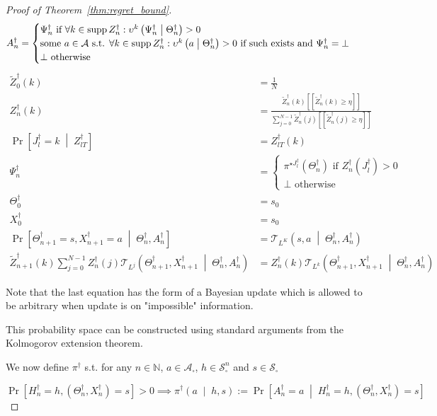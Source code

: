 \documentclass[anon,12pt]{colt2018} %
\DeclareMathOperator{\Supp}{supp}
\newcommand{\AP}[1]{\left(#1\right)}
\newcommand{\APM}[2]{\left(#1\;\middle\vert\;#2\right)}
\newcommand{\ABM}[2]{\left[#1\;\middle\vert\;#2\right]}
\newcommand{\CP}[3]{\underset{#1}{\operatorname{Pr}}\ABM{#2}{#3}}
\newcommand{\Nats}{\mathbb{N}}
\newcommand{\A}{\mathcal{A}}
\newcommand{\St}{\mathcal{S}}
\newcommand{\T}{\mathcal{T}}
\newcommand{\Ad}{\upsilon}
\begin{document}
\begin{proof}[Proof of Theorem~\ref{thm:regret_bound}]
\[A^\dagger_n = \begin{cases} \Psi^\dagger_n \text{ if } \forall k \in \Supp{Z^\dagger_n}: \Ad^k\APM{\Psi^\dagger_n}{\Theta^\dagger_n} > 0 \\ \text{some } a\in\A \text{ s.t. } \forall k \in \Supp{Z^\dagger_n}: \Ad^k\APM{a}{\Theta^\dagger_n} > 0 \text{ if such exists and } \Psi^\dagger_n=\bot\\\bot \text{ otherwise} \end{cases}\\\]
%
\begin{align*}
\tilde{Z}^\dagger_0(k)&=\frac{1}{N} \\ 
Z^\dagger_{n}(k) &= \frac{\tilde{Z}^\dagger_{n}(k)[[\tilde{Z}^\dagger_{n}(k) \geq \eta]] }{\sum_{j = 0}^{N-1}\tilde{Z}^\dagger_{n}(j)[[\tilde{Z}^\dagger_{n}(j) \geq \eta]]}\\
\CP{}{J^\dagger_{l} = k}{Z^\dagger_{lT}} &= Z^\dagger_{lT}\left(k\right)\\
\Psi^\dagger_{n} &= \begin{cases} \pi^{\star J^\dagger_l}\AP{\Theta^\dagger_n} \text{ if } Z^\dagger_n\AP{J^\dagger_l} > 0 \\ \bot \text{ otherwise} \end{cases}\\
\Theta^\dagger_0 &= s_0\\
X^\dagger_0 &= s_0\\
\CP{}{\Theta^\dagger_{n+1} = s,X^\dagger_{n+1}=a}{\Theta^\dagger_{n},A^\dagger_n} &= \T_{L^K}\APM{s,a}{\Theta^\dagger_n,A^\dagger_n}\\
\tilde{Z}^\dagger_{n+1}(k)\sum_{j = 0}^{N-1} Z^\dagger_n(j) \T_{L^j}\APM{\Theta^\dagger_{n+1},X^\dagger_{n+1}}{\Theta^\dagger_n,A^\dagger_n}&=Z^\dagger_{n}(k) \T_{L^k}\APM{\Theta^\dagger_{n+1},X^\dagger_{n+1}}{\Theta^\dagger_n,A^\dagger_n}
\end{align*}

Note that the last equation has the form of a Bayesian update which is allowed to be arbitrary when update is on "impossible" information.

This probability space can be constructed using standard arguments from the Kolmogorov extension theorem.

We now define $\pi^\dagger$ s.t. for any $n \in \Nats$, $a \in \A_\square$, $h \in \St_\square^n$ and $s\in\St_\square$

$$\Pr\left[H^\dagger_n=h,\AP{\Theta^\dagger_n,X^\dagger_n}=s\right] > 0 \implies \pi^\dagger\APM{a}{h,s}:=\CP{}{A^\dagger_n=a}{H^\dagger_n=h,\AP{\Theta^\dagger_n,X^\dagger_n}=s}$$


\end{proof}
\end{document}
